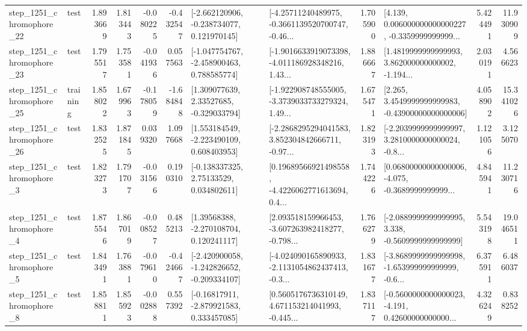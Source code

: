\begin{tabular}{llrrrrllrlrr}
 step\_1251\_chromophore\_22 &      test &      1.893669 &    1.813443 &     -0.080225 & -0.432547 &   [-2.662120906, -0.238734077, 0.121970145] &  [-4.25711240489975, -0.3661139520700747, -0.46... &       1.705900 &  [4.139, 0.006000000000000227, -0.3359999999999... &            5.424491 &         11.930909 \\
 step\_1251\_chromophore\_23 &      test &      1.795517 &    1.753581 &     -0.041936 &  0.057563 &   [-1.047754767, -2.458900463, 0.788585774] &  [-1.9016633919073398, -4.011186928348216, 1.43... &       1.886667 &  [1.4819999999999993, 3.862000000000002, -1.194... &            2.030191 &          4.566623 \\
 step\_1251\_chromophore\_25 &  training &      1.858022 &    1.679963 &     -0.178059 & -1.684848 &     [1.309077639, 2.33527685, -0.329033794] &  [-1.922908748555005, -3.3739033733279324, 1.49... &       1.675471 &  [2.265, 3.4549999999999983, -0.43900000000000006] &            4.058902 &         15.341026 \\
 step\_1251\_chromophore\_26 &      test &      1.832525 &    1.871845 &      0.039320 &  1.097668 &    [1.553184549, -2.223490109, 0.608403953] &  [-2.2868295294041583, 3.852304842666711, -0.97... &       1.823193 &  [-2.2039999999999997, 3.2810000000000024, -0.8... &            1.121056 &          3.125070 \\
  step\_1251\_chromophore\_3 &      test &      1.823273 &    1.791707 &     -0.031566 &  0.190310 &     [-0.138337325, 2.75133529, 0.034802611] &  [0.19689566921498558, -4.4226062771613694, 0.4... &       1.744226 &  [0.06800000000000006, -4.075, -0.3689999999999... &            4.845941 &         11.230716 \\
  step\_1251\_chromophore\_4 &      test &      1.875546 &    1.867019 &     -0.008527 &  0.485213 &     [1.39568388, -2.270108704, 0.120241117] &  [2.093518159966453, -3.607263982418277, -0.798... &       1.766279 &  [-2.0889999999999995, 3.338, -0.5609999999999999] &            5.543198 &         19.046511 \\
  step\_1251\_chromophore\_5 &      test &      1.843491 &    1.763881 &     -0.079610 & -0.424667 &  [-2.420900058, -1.242826652, -0.209334107] &  [-4.024090165890933, -2.1131054862437413, -0.3... &       1.831677 &  [-3.8689999999999998, -1.653999999999999, -0.6... &            6.375911 &          6.486037 \\
  step\_1251\_chromophore\_8 &      test &      1.858811 &    1.855923 &     -0.002888 &  0.557392 &    [-0.16817911, -2.879921583, 0.333457085] &  [0.5605176736310149, 4.671153214041993, -0.445... &       1.837117 &  [-0.5600000000000023, -4.191, 0.42600000000000... &            4.326249 &          0.838252 \\

\end{tabular}
